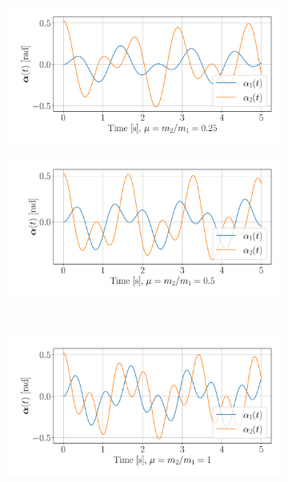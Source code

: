 \documentclass{report}
\numberwithin{tm}{section}
\begin{document}
\begin{figure}[h]
	\centering
	\begin{subfigure}{0.49\textwidth}
		\centering
		\includegraphics[width=\textwidth]{figures/angular_movement_dp0.25.pdf}
	\end{subfigure} \hfill
	\begin{subfigure}{0.49\textwidth}
	\centering
	\includegraphics[width=\textwidth]{figures/angular_movement_dp0.5.pdf}
	\end{subfigure} \\
	\begin{subfigure}{0.49\textwidth}
	\centering
	\includegraphics[width=\textwidth]{figures/angular_movement_dp1.pdf}

\end{subfigure}
\end{figure}
\end{document}
